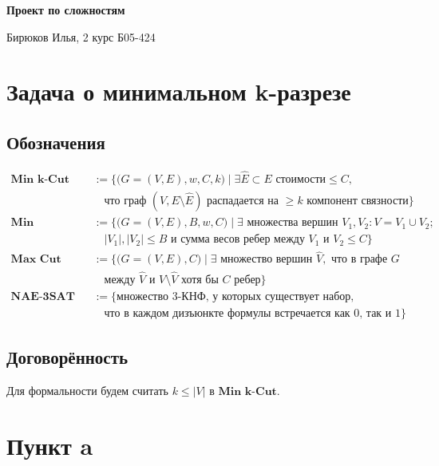 \documentclass[12pt,a4paper]{article}
\begin{document}
\begin{center}
    \Large \textbf{Проект по сложностям}
\end{center}

\begin{flushright}
    \normalsize Бирюков Илья, 2 курс Б05-424
\end{flushright}

\vspace{1cm}

\section*{Задача о минимальном k-разрезе}

\subsection*{Обозначения}
\begin{align*}
\textbf{Min k-Cut} &:= \Big\{ \big(G = (V, E), w, C, k\big) \mid \exists \hat{E} \subset E \text{ стоимости} \le C, \\
&\quad \text{что граф } (V, E \setminus \hat{E}) \text{ распадается на } \ge k \text{ компонент связности} \Big\} \\[6pt]
\textbf{Min Balanced Cut} &:= \Big\{ \big(G = (V, E), B, w, C\big) \mid \exists \text{ множества вершин } V_1, V_2: V = V_1 \cup V_2; \\
&\quad |V_1|, |V_2| \le B \text{ и сумма весов ребер между } V_1 \text{ и } V_2 \le C \Big\} \\[6pt]
\textbf{Max Cut} &:= \Big\{ \big(G = (V, E), C\big) \mid \exists \text{ множество вершин } \hat{V}, \text{ что в графе } G \\
&\quad \text{между } \hat{V} \text{ и } V \setminus \hat{V} \text{ хотя бы } C \text{ ребер} \Big\} \\[6pt]
\textbf{NAE-3SAT} &:= \Big\{ \text{множество 3-КНФ, у которых существует набор,} \\
&\quad \text{что в каждом дизъюнкте формулы встречается как 0, так и 1} \Big\}
\end{align*}

\subsection*{Договорённость}
Для формальности будем считать $k \le |V|$ в $\textbf{Min k-Cut}$.

\section*{Пункт a}
\end{document}
